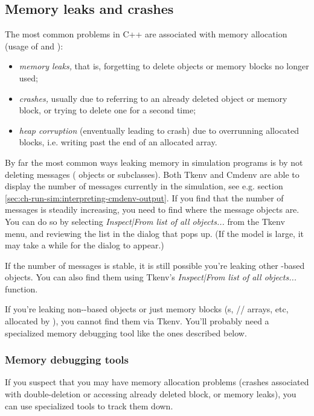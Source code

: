 \subsection{Memory leaks and crashes}

The most common problems in C++ are associated with memory allocation
(usage of  and ):

\begin{itemize}
   \item{\textit{memory leaks,} that is, forgetting to delete objects
     or memory blocks no longer used;}
   \item{\textit{crashes,} usually due to referring to an already deleted
     object or memory block, or trying to delete one for a second time;}
   \item{\textit{heap corruption} (enventually leading to crash) due to
     overrunning allocated blocks, i.e. writing past the end of an allocated
     array.}
\end{itemize}

By far the most common ways leaking memory in simulation programs
is by not deleting messages ( objects or subclasses).
Both Tkenv and Cmdenv are able to display the number of messages
currently in the simulation,
see e.g. section \ref{sec:ch-run-sim:interpreting-cmdenv-output}.
If you find that the number of messages is steadily increasing,
you need to find where the message objects are. You can do so
by selecting \textit{Inspect|From list of all objects...} from
the Tkenv menu, and reviewing the list in the dialog that pops up.
(If the model is large, it may take a while for the dialog to appear.)

If the number of messages is stable, it is still possible
you're leaking other -based objects. You can
also find them using Tkenv's \textit{Inspect|From list of all objects...}
function.

If you're leaking non--based objects or just
memory blocks (s, // arrays,
etc, allocated by ), you cannot find them via Tkenv.
You'll probably need a specialized memory debugging tool like
the ones described below.

\subsubsection{Memory debugging tools}

If you suspect that you may have memory allocation problems
(crashes associated with double-deletion or accessing already
deleted block, or memory leaks), you can use specialized tools
to track them down.

